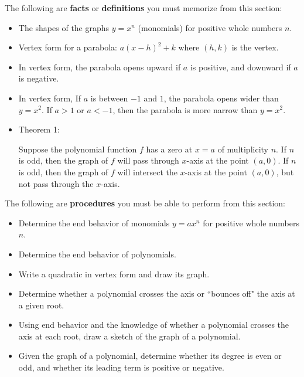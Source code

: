 \documentclass{ximera}
\begin{document}
The following are \textbf{facts} or \textbf{definitions} you must memorize from this section:
\begin{itemize}
\item The shapes of the graphs $y=x^n$ (monomials) for positive whole numbers $n$.
\item Vertex form for a parabola: $a(x-h)^2+k$ where $(h,k)$ is the vertex.
\item In vertex form, the parabola opens upward if $a$ is positive, and downward if $a$ is negative.
\item In vertex form, If $a$ is between $-1$ and $1$, the parabola opens wider than $y=x^2$. If $a>1$ or $a<-1$, then the parabola is more narrow than $y=x^2$.
\item Theorem 1:

	Suppose the polynomial function $f$ has a zero at $x=a$ of multiplicity $n$.  If $n$ is odd, then the graph of $f$ will pass through $x$-axis at the point $(a,0)$.
	If $n$ is odd, then the graph of $f$ will intersect the $x$-axis at the point $(a,0)$, but not pass through the $x$-axis.
\end{itemize}

The following are \textbf{procedures} you must be able to perform from this section:
\begin{itemize}
\item Determine the end behavior of monomials $y=ax^n$ for positive whole numbers $n$.
\item Determine the end behavior of polynomials.
\item Write a quadratic in vertex form and draw its graph.
\item Determine whether a polynomial crosses the axis or ``bounces off" the axis at a given root.
\item Using end behavior and the knowledge of whether a polynomial crosses the axis at each root, draw a sketch of the graph of a polynomial.
\item Given the graph of a polynomial, determine whether its degree is even or odd, and whether its leading term is positive or negative.
\end{itemize}
\end{document}
